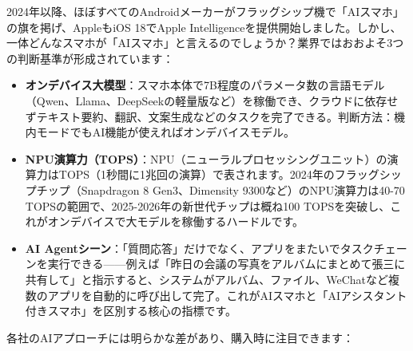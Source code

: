 


2024年以降、ほぼすべてのAndroidメーカーがフラッグシップ機で「AIスマホ」の旗を掲げ、AppleもiOS 18でApple Intelligenceを提供開始しました。しかし、一体どんなスマホが「AIスマホ」と言えるのでしょうか？業界ではおおよそ3つの判断基準が形成されています：

\begin{itemize}
  \item \textbf{オンデバイス大模型}：スマホ本体で7B程度のパラメータ数の言語モデル（Qwen、Llama、DeepSeekの軽量版など）を稼働でき、クラウドに依存せずテキスト要約、翻訳、文案生成などのタスクを完了できる。判断方法：機内モードでもAI機能が使えればオンデバイスモデル。
  \item \textbf{NPU演算力（TOPS）}：NPU（ニューラルプロセッシングユニット）の演算力はTOPS（1秒間に1兆回の演算）で表されます。2024年のフラッグシップチップ（Snapdragon 8 Gen3、Dimensity 9300など）のNPU演算力は40-70 TOPSの範囲で、2025-2026年の新世代チップは概ね100 TOPSを突破し、これがオンデバイスで大モデルを稼働するハードルです。
  \item \textbf{AI Agentシーン}：「質問応答」だけでなく、アプリをまたいでタスクチェーンを実行できる——例えば「昨日の会議の写真をアルバムにまとめて張三に共有して」と指示すると、システムがアルバム、ファイル、WeChatなど複数のアプリを自動的に呼び出して完了。これがAIスマホと「AIアシスタント付きスマホ」を区別する核心の指標です。
\end{itemize}


各社のAIアプローチには明らかな差があり、購入時に注目できます：

